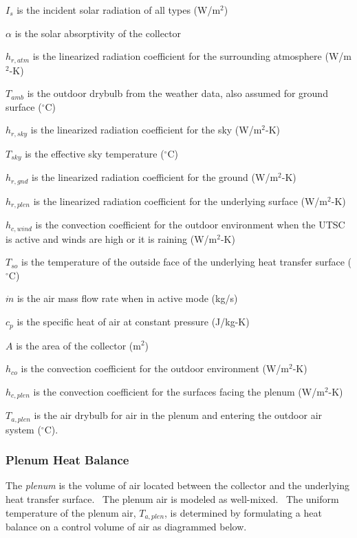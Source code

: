 \({I_s}\) is the incident solar radiation of all types (W/m\(^{2}\))

\(\alpha\) is the solar absorptivity of the collector

\({h_{r,atm}}\) is the linearized radiation coefficient for the surrounding atmosphere (W/m\(^{2}\)-K)

\({T_{amb}}\) is the outdoor drybulb from the weather data, also assumed for ground surface (\(^{\circ}\)C)

\({h_{r,sky}}\) is the linearized radiation coefficient for the sky (W/m\(^{2}\)-K)

\({T_{sky}}\) is the effective sky temperature (\(^{\circ}\)C)

\({h_{r,gnd}}\) is the linearized radiation coefficient for the ground (W/m\(^{2}\)-K)

\({h_{r,plen}}\) is the linearized radiation coefficient for the underlying surface (W/m\(^{2}\)-K)

\({h_{c,wind}}\) is the convection coefficient for the outdoor environment when the UTSC is active and winds are high or it is raining (W/m\(^{2}\)-K)

\({T_{so}}\) is the temperature of the outside face of the underlying heat transfer surface (\(^{\circ}\)C)

\(\dot m\) is the air mass flow rate when in active mode (kg/s)

\({c_p}\) is the specific heat of air at constant pressure (J/kg-K)

\(A\) is the area of the collector (m\(^{2}\))

\({h_{co}}\) is the convection coefficient for the outdoor environment (W/m\(^{2}\)-K)

\({h_{c,plen}}\) is the convection coefficient for the surfaces facing the plenum (W/m\(^{2}\)-K)

\({T_{a,plen}}\) is the air drybulb for air in the plenum and entering the outdoor air system (\(^{\circ}\)C).

\subsubsection{Plenum Heat Balance}\label{plenum-heat-balance}

The \emph{plenum} is the volume of air located between the collector and the underlying heat transfer surface.~ The plenum air is modeled as well-mixed.~ The uniform temperature of the plenum air, \({T_{a,plen}}\), is determined by formulating a heat balance on a control volume of air as diagrammed below.

